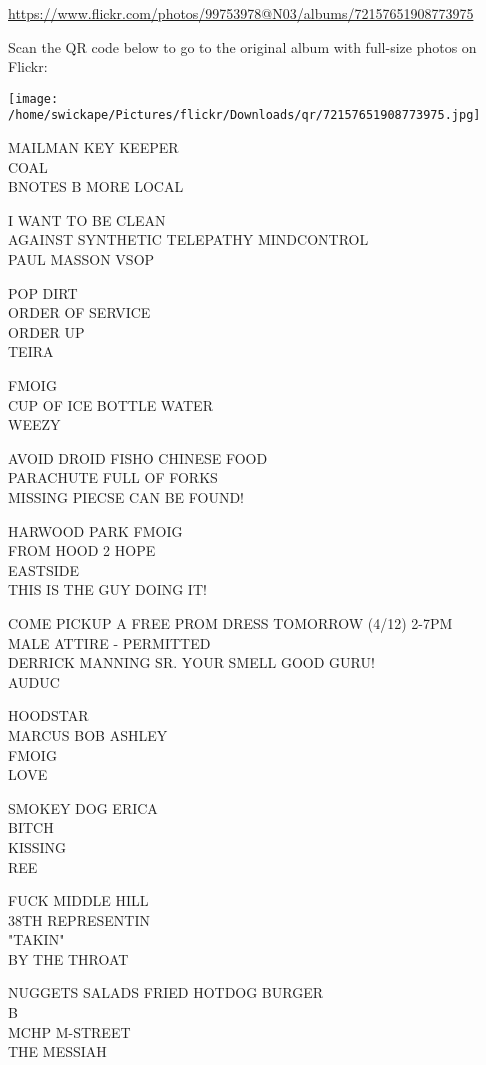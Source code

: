 \documentclass[10pt,letterpaper]{article}
\begin{document}
\url{https://www.flickr.com/photos/99753978@N03/albums/72157651908773975}

Scan the QR code below to go to the original album with full-size photos on Flickr:

\texttt{[image: /home/swickape/Pictures/flickr/Downloads/qr/72157651908773975.jpg]}
\pagebreak

MAILMAN KEY KEEPER\\
COAL\\
BNOTES B MORE LOCAL

I WANT TO BE CLEAN\\
AGAINST SYNTHETIC TELEPATHY MINDCONTROL\\
PAUL MASSON VSOP

POP DIRT\\
ORDER OF SERVICE\\
ORDER UP\\
TEIRA

FMOIG\\
CUP OF ICE BOTTLE WATER\\
WEEZY

AVOID DROID FISHO CHINESE FOOD\\
PARACHUTE FULL OF FORKS\\
MISSING PIECSE CAN BE FOUND!

HARWOOD PARK FMOIG\\
FROM HOOD 2 HOPE\\
EASTSIDE\\
THIS IS THE GUY DOING IT!

COME PICKUP A FREE PROM DRESS TOMORROW (4/12) 2{-}7PM\\
MALE ATTIRE {-} PERMITTED\\
DERRICK MANNING SR.  YOUR SMELL GOOD GURU!\\
AUDUC

HOODSTAR\\
MARCUS BOB ASHLEY\\
FMOIG\\
LOVE

SMOKEY DOG ERICA\\
BITCH\\
KISSING\\
REE

FUCK MIDDLE HILL\\
38TH REPRESENTIN\\
"TAKIN"\\
BY THE THROAT

NUGGETS SALADS FRIED HOTDOG BURGER\\
B\\
MCHP M{-}STREET\\
THE MESSIAH
\end{document}
